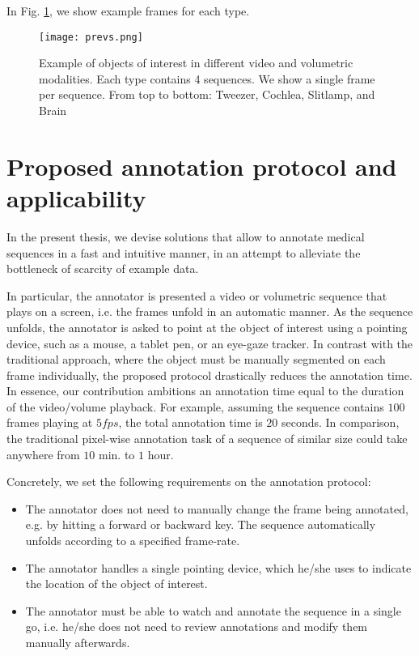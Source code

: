 In Fig. \ref{fig:dset_previews}, we show example frames for each type.

\begin{figure}
\centering
\texttt{[image: prevs.png]}
\caption{Example of objects of interest in different video and volumetric modalities. Each type contains 4 sequences. We show a single frame per sequence.
  From top to bottom: Tweezer, Cochlea, Slitlamp, and Brain}
\label{fig:dset_previews}
\end{figure}

\section{Proposed annotation protocol and applicability}

In the present thesis, we devise solutions that allow to annotate medical sequences in a fast and intuitive manner, in an attempt to alleviate the bottleneck of scarcity of example data.

In particular, the annotator is presented a video or volumetric sequence that plays on a screen, i.e. the frames unfold in an automatic manner.
As the sequence unfolds, the annotator is asked to point at the object of interest using a pointing device, such as a mouse, a tablet pen, or an eye-gaze tracker.
In contrast with the traditional approach, where the object must be manually segmented on each frame individually, the proposed protocol drastically reduces the annotation time.
In essence, our contribution ambitions an annotation time equal to the duration of the video/volume playback.
For example, assuming the sequence contains $100$ frames playing at $5fps$, the total annotation time is $20$ seconds.
In comparison, the traditional pixel-wise annotation task of a sequence of similar size could take anywhere from $10$ min. to $1$ hour.

Concretely, we set the following requirements on the annotation protocol:
\begin{itemize}
  \item The annotator does not need to manually change the frame being annotated, e.g. by hitting a forward or backward key. The sequence automatically unfolds according to a specified frame-rate.
  \item The annotator handles a single pointing device, which he/she uses to indicate the location of the object of interest.
  \item The annotator must be able to watch and annotate the sequence in a single go, i.e. he/she does not need to review annotations and modify them manually afterwards.
\end{itemize}

